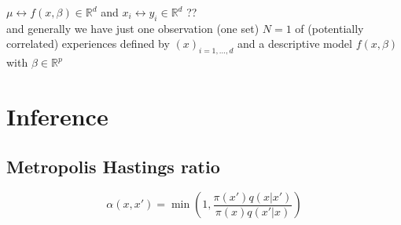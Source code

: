 \documentclass[11pt]{article}
\begin{document}
 $\mu \leftrightarrow f(x,\beta) \in \mathbb{R}^d$ 
 and $x_i \leftrightarrow y_i\in \mathbb{R}^d$ ?? \\

 and generally we have just one observation (one set) $N=1$ of (potentially 
 correlated) experiences defined by $(x)_{i=1,...,d}$ and a descriptive model
 $f(x,\beta)$ with $\beta \in \mathbb{R}^p$

\section{Inference }

\subsection{Metropolis Hastings ratio}

\begin{equation*}
    \alpha(x,x')=\min \left( 1, \frac{\pi(x')q(x|x')}{\pi(x)q(x'|x)}\right)
\end{equation*}
\end{document}
